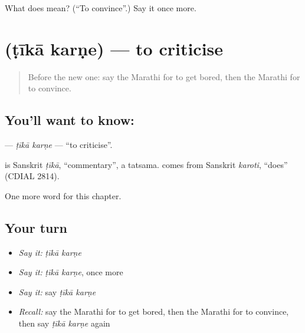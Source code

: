 \begin{tcolorbox}[breakable,colback=teal!4,colframe=teal!35!black,title={Before you move on}]
What does  mean? (\textquotedblleft{}To convince\textquotedblright{}.) Say it once more.
\end{tcolorbox}
\section[\texorpdfstring{\mr{टीका} \mr{करणे} (ṭīkā karṇe)}{टीका करणे (ṭīkā karṇe)}]{  (ṭīkā karṇe) — to criticise}

\label{lesson:MR-C225-tika-karne}



\begin{quote}
Before the new one: say the Marathi for to get bored, then the Marathi for to convince.
\end{quote}

\subsection*{You'll want to know:  }
\textbf{ } — \emph{ṭīkā karṇe} — \textquotedblleft{}to criticise\textquotedblright{}.

\begin{cousinweb}
\textbf{} is Sanskrit \emph{ṭīkā}, \textquotedblleft{}commentary\textquotedblright{}, a tatsama. \textbf{} comes from Sanskrit \emph{karoti}, \textquotedblleft{}does\textquotedblright{} (CDIAL 2814).
\end{cousinweb}

\begin{grammarlens}[title={What you've built}]
One more word for this chapter.
\end{grammarlens}

\subsection*{Your turn}
\begin{itemize}
\raggedright
  \item \emph{Say it:} \emph{ṭīkā karṇe}
  \item \emph{Say it:} \emph{ṭīkā karṇe}, once more
  \item \emph{Say it:} say \emph{ṭīkā karṇe}
  \item \emph{Recall:} say the Marathi for to get bored, then the Marathi for to convince, then say \emph{ṭīkā karṇe} again
\end{itemize}

